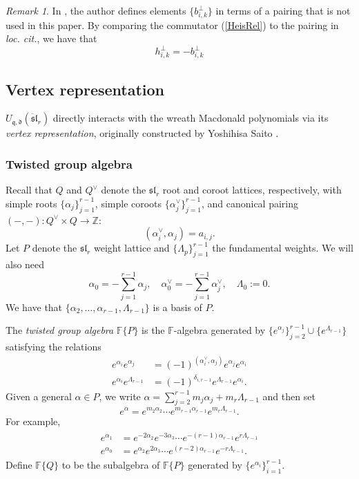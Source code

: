 \documentclass{amsart}
\newcommand{\Z}{\mathbb{Z}}
\newcommand{\K}{\mathbb{K}}
\newcommand{\F}{\mathbb{F}}
\newcommand{\qqq}{\mathfrak{q}}
\newcommand{\ddd}{\mathfrak{d}}
\theoremstyle{remark}
\newtheorem{rem}[thm]{Remark}
\numberwithin{thm}{section}
\numberwithin{equation}{section}
\begin{document}
\begin{rem}\label{PerpRem}
In \cite{Wen}, the author defines elements $\{b_{i,k}^\perp\}$ in terms of a pairing that is not used in this paper.
By comparing the commutator (\ref{HeisRel}) to the pairing in \textit{loc. cit.}, we have that
\[
h_{i,k}^\perp=-b_{i,k}^\perp
\]
\end{rem}

\subsection{Vertex representation}
$U_{\qqq,\ddd}(\ddot{\mathfrak{sl}}_r)$ directly interacts with the wreath Macdonald polynomials via its \textit{vertex representation}, originally constructed by Yoshihisa Saito \cite{Saito}.

\subsubsection{Twisted group algebra}
Recall that $Q$ and $Q^\vee$ denote the $\mathfrak{sl}_r$ root and coroot lattices, respectively, with simple roots $\{\alpha_j\}_{j=1}^{r-1}$, simple coroots $\{\alpha^\vee_j\}_{j=1}^{r-1}$, and canonical pairing $(-,-) : Q^\vee\times Q \to \Z$:
\[
(\alpha_i^\vee,\alpha_j)=a_{i,j}.
\] 
Let $P$ denote the $\mathfrak{sl}_r$ weight lattice and $\{\Lambda_p\}_{j=1}^{r-1}$ the fundamental weights. 
We will also need
\[
\alpha_0=-\sum_{j=1}^{r-1}\alpha_j,\quad
\alpha^\vee_0=-\sum_{j=1}^{r-1}\alpha^\vee_j,\quad
\Lambda_0:=0.
\]
We have that $\{\alpha_2,\ldots,\alpha_{r-1},\Lambda_{r-1}\}$ is a basis of $P$. 

The \textit{twisted group algebra} $\F\{P\}$ is the $\F$-algebra generated by $\{e^{\alpha_j}\}_{j=2}^{r-1}\cup\{e^{\Lambda_{r-1}}\}$ satisfying the relations
\begin{align*}
e^{\alpha_i}e^{\alpha_j}&=(-1)^{\left( \alpha^\vee_i,\alpha_j\right)}e^{\alpha_j}e^{\alpha_i}\\
e^{\alpha_i}e^{\Lambda_{r-1}}&=(-1)^{\delta_{i,r-1}}e^{\Lambda_{r-1}}e^{\alpha_i}.
\end{align*}
Given a general $\alpha\in P$, we write $\alpha=\sum_{j=2}^{r-1}m_j\alpha_j+m_{r}\Lambda_{r-1}$ and then set
\[e^{\alpha}=e^{m_2\alpha_2}\cdots e^{m_{r-1}\alpha_{r-1}}e^{m_r\Lambda_{r-1}}.\]
For example,
\begin{align}
\begin{split}
e^{\alpha_1}&=e^{-2\alpha_2}e^{-3\alpha_3}\cdots e^{-(r-1)\alpha_{r-1}}e^{r\Lambda_{r-1}}\\
e^{\alpha_0}&=e^{\alpha_2}e^{2\alpha_3}\cdots e^{(r-2)\alpha_{r-1}}e^{-r\Lambda_{r-1}}.
\end{split}
\label{TwistedAlpha}
\end{align}
Define $\F\{Q\}$ to be the subalgebra of $\F\{P\}$ generated by $\{e^{\alpha_i}\}_{i=1}^{r-1}$. 
\end{document}
